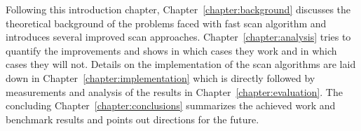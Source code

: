 Following this introduction chapter, Chapter~\ref{chapter:background} discusses
the theoretical background of the problems faced with fast scan algorithm and
introduces several improved scan approaches. Chapter~\ref{chapter:analysis}
tries to quantify the improvements and shows in which cases they work and in
which cases they will not. Details on the implementation of the scan algorithms
are laid down in Chapter~\ref{chapter:implementation} which is directly
followed by measurements and analysis of the results in
Chapter~\ref{chapter:evaluation}. The concluding
Chapter~\ref{chapter:conclusions} summarizes the achieved work and benchmark
results and points out directions for the future.
